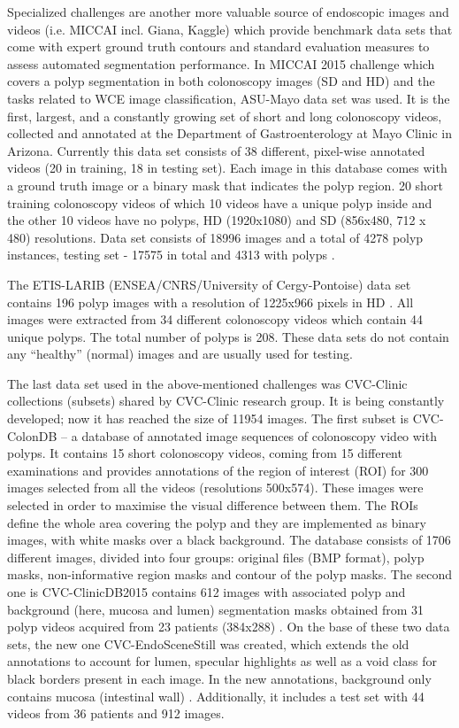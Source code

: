 \documentclass[preprint]{article}
\begin{document}
Specialized challenges are another more valuable source of endoscopic images and videos (i.e. MICCAI incl. Giana, Kaggle) which provide benchmark data sets that come with expert ground truth contours and standard evaluation measures to assess automated segmentation performance. 
In MICCAI 2015 challenge which covers a polyp segmentation in both colonoscopy images (SD and HD) and the tasks related to WCE image classification, ASU-Mayo data set was used. It is the first, largest, and a constantly growing set of short and long colonoscopy videos, collected and annotated at the Department of Gastroenterology at Mayo Clinic in Arizona. Currently this data set consists of 38 different, pixel-wise annotated videos (20 in training, 18 in testing set). Each image in this database comes with a ground truth image or a binary mask that indicates the polyp region. 20 short training colonoscopy videos of which 10 videos have a unique polyp inside and the other 10 videos have no polyps, HD (1920x1080) and SD (856x480, 712 x 480)  resolutions. Data set consists of 18996 images and a total of 4278 polyp instances, testing set -  17575 in total and 4313 with polyps \cite{Mayo}.

The ETIS-LARIB (ENSEA/CNRS/University of Cergy-Pontoise) data set contains 196 polyp images with a resolution of 1225x966 pixels in HD \cite{ETIS}. All images were extracted from 34 different colonoscopy videos which contain 44 unique polyps. The total number of polyps is 208. These data sets do not contain any “healthy” (normal) images and are usually used for testing.

The last data set used in the above-mentioned challenges was CVC-Clinic collections (subsets) shared by CVC-Clinic research group. It is being constantly developed; now it has reached the size of 11954 images. The first subset is CVC-ColonDB -- a database of annotated image sequences of colonoscopy video with polyps. It contains 15 short colonoscopy videos, coming from 15 different examinations and provides annotations of the region of interest (ROI)  for 300 images selected from all the videos (resolutions 500x574). These images were selected in order to maximise the visual difference between them. The ROIs define the whole area covering the polyp and they are implemented as binary images, with white masks over a black background. The database consists of 1706 different images, divided into four groups: original files (BMP format), polyp masks, non-informative region masks and contour of the polyp masks. The second one is CVC-ClinicDB2015 contains 612 images with associated polyp and background (here, mucosa and lumen) segmentation masks obtained from 31 polyp videos acquired from 23 patients (384x288) \cite{bernal2012}. On the base of these two data sets, the new one CVC-EndoSceneStill was created, which extends the old annotations to account for lumen, specular highlights as well as a void class for black borders present in each image. In the new annotations, background only contains mucosa (intestinal wall) \cite{Vazquez17}. Additionally, it includes a test set with 44 videos from 36 patients and 912 images.
\end{document}

